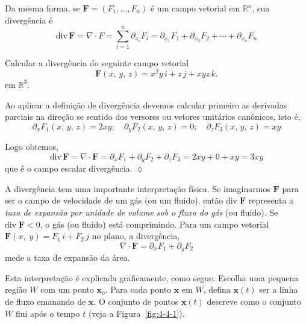 Da mesma forma, se \(\mathbf{F} = (F_{1},\ldots, F_{n})\) é um campo vetorial em \(\mathbb{R}^{n}\), sua divergência é
\begin{equation*}
	\mathrm{div}\, \mathbf{F} = \nabla \cdot F= \sum_{i=1}^{n}\partial_{x_{i}}F_{i}=\partial_{x_{1}}F_{1}+ \partial_{x_{2}}F_{2}+\cdots+\partial_{x_{n}}F_{n}
\end{equation*}

\begin{exc}
	Calcular a divergência do seguinte campo vetorial
	\begin{equation*}
		\mathbf{F}(x,\, y,\, z) = x^{2}y\,i + z\, j + xyz\, k.
	\end{equation*}
	em $\mathbb{R}^{3}$.
\end{exc}

\solo
Ao aplicar a definição de divergência devemos calcular primeiro as derivadas parciais na direção se sentido dos versores ou vetores
unitários canônicos, isto é,
\begin{equation*}
	\partial_{x}F_{1}(x,\, y, \, z)= 2xy ;  \quad \partial_{y}F_{2}(x,\, y, \, z)=0 ; \quad \partial_{z}F_{3}(x,\, y, \, z)=xy
\end{equation*}

Logo obtemos,
\begin{equation*}
	\mathrm{div}\, \mathbf{F} = \nabla \cdot \mathbf{F} = \partial_{x}F_{1}+\partial_{y}F_{2}+\partial_{z}F_{3} =2xy+0+xy=3xy
\end{equation*}
que é o \textsf{campo escalar divergência}. \hfill $\lozenge$

\bigskip
A divergência tem uma importante interpretação física. Se imaginarmos \(\mathbf{F}\) para ser o campo de velocidade de um gás (ou um fluido), então
\(\mathrm{div}\; \mathbf{F}\) representa a \textit{taxa de expansão por unidade de volume sob o fluxo do gás} (ou fluido). Se \(\mathrm{div}\; \mathbf{F} < 0\), o gás
(ou fluido) está comprimindo. Para um campo vetorial \(\mathbf{F}(x,\; y) = F_{1}\,i + F_{2}\, j\) no plano, a divergência,
\begin{equation*}
	\nabla\cdot \mathbf{F} = \partial_{x}F_{1}+\partial_{y}F_{2}
\end{equation*}
mede a taxa de expansão da área.

Esta interpretação é explicada graficamente, como segue. Escolha uma pequena região \(W\) com um ponto \(\mathbf{x}_{0}\). Para cada ponto
\(\mathbf{x}\) em \(W\), defina \(\mathbf{x}(t)\) ser a linha de fluxo emanando de \(\mathbf{x}\). O conjunto de pontos \(\mathbf{x}(t)\) descreve
como o conjunto \(W\) flui após o tempo \(t\) (veja a Figura~\ref{fig:4-4-1}).

